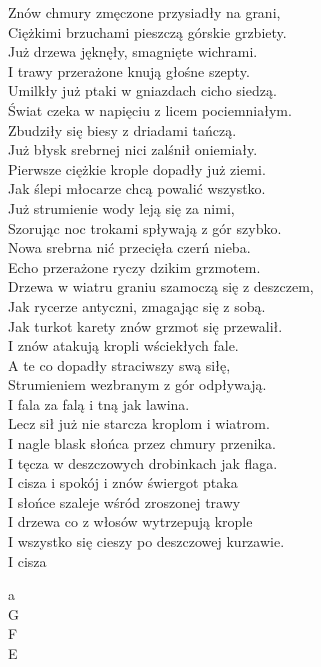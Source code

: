 \begin{text}
    Znów chmury zmęczone przysiadły na grani,\\
    Ciężkimi brzuchami pieszczą górskie grzbiety.\\
    Już drzewa jęknęły, smagnięte wichrami.\\
    I trawy przerażone knują głośne szepty.\\
    Umilkły już ptaki w gniazdach cicho siedzą.\\
    Świat czeka w napięciu z licem pociemniałym.\\
    Zbudziły się biesy z driadami tańczą.\\
    Już błysk srebrnej nici zalśnił oniemiały.\\
    Pierwsze ciężkie krople dopadły już ziemi.\\
    Jak ślepi młocarze chcą powalić wszystko.\\
    Już strumienie wody leją się za nimi,\\
    Szorując noc trokami spływają z gór szybko.\\
    Nowa srebrna nić przecięła czerń nieba.\\
    Echo przerażone ryczy dzikim grzmotem.\\
    Drzewa w wiatru graniu szamoczą się z deszczem,\\
    Jak rycerze antyczni, zmagając się z sobą.\\
    Jak turkot karety znów grzmot się przewalił.\\
    I znów atakują kropli wściekłych fale.\\
    A te co dopadły straciwszy swą siłę,\\
    Strumieniem wezbranym z gór odpływają.\\
    I fala za falą i tną jak lawina.\\
    Lecz sił już nie starcza kroplom i wiatrom.\\
    I nagle blask słońca przez chmury przenika.\\
    I tęcza w deszczowych drobinkach jak flaga.\\
    I cisza i spokój i znów świergot ptaka\\
    I słońce szaleje wśród zroszonej trawy\\
    I drzewa co z włosów wytrzepują krople\\
    I wszystko się cieszy po deszczowej kurzawie.\\
    I cisza

\end{text}
\begin{chord}
    a\\
    G\\
    F\\
    E
\end{chord}
